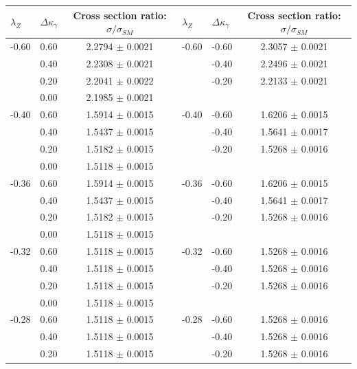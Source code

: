 \begin{table}[h]
\begin{center}
  \begin{tabular}{l l c | l l c}
    \hline  \hline
    $\lambda_Z$  &  $\Delta{\kappa_\gamma}$  & Cross section ratio: $\sigma/\sigma_{SM}$ & 
    $\lambda_Z$  &  $\Delta{\kappa_\gamma}$  & Cross section ratio: $\sigma/\sigma_{SM}$\\\hline
-0.60 & 0.60 & 2.2794 $\pm$ 0.0021 & -0.60 & -0.60 & 2.3057 $\pm$ 0.0021 \\ 
      & 0.40 & 2.2308 $\pm$ 0.0021 &       & -0.40 & 2.2496 $\pm$ 0.0021 \\ 
      & 0.20 & 2.2041 $\pm$ 0.0022 &       & -0.20 & 2.2133 $\pm$ 0.0021 \\ 
      & 0.00 & 2.1985 $\pm$ 0.0021 & &     &                            \\ \hline
-0.40 & 0.60 & 1.5914 $\pm$ 0.0015 & -0.40 & -0.60 & 1.6206 $\pm$ 0.0015 \\ 
      & 0.40 & 1.5437 $\pm$ 0.0015 &       & -0.40 & 1.5641 $\pm$ 0.0017 \\ 
      & 0.20 & 1.5182 $\pm$ 0.0015 &       & -0.20 & 1.5268 $\pm$ 0.0016 \\ 
      & 0.00 & 1.5118 $\pm$ 0.0015 &       &       &                     \\ \hline
-0.36 & 0.60 & 1.5914 $\pm$ 0.0015 & -0.36 & -0.60 & 1.6206 $\pm$ 0.0015 \\ 
      & 0.40 & 1.5437 $\pm$ 0.0015 &       & -0.40 & 1.5641 $\pm$ 0.0017 \\ 
      & 0.20 & 1.5182 $\pm$ 0.0015 &       & -0.20 & 1.5268 $\pm$ 0.0016 \\ 
      & 0.00 & 1.5118 $\pm$ 0.0015 &       &       &                     \\ \hline
-0.32 & 0.60 & 1.5118 $\pm$ 0.0015 & -0.32 & -0.60 & 1.5268 $\pm$ 0.0016 \\ 
      & 0.40 & 1.5118 $\pm$ 0.0015 &       & -0.40 & 1.5268 $\pm$ 0.0016 \\ 
      & 0.20 & 1.5118 $\pm$ 0.0015 &       & -0.20 & 1.5268 $\pm$ 0.0016 \\ 
      & 0.00 & 1.5118 $\pm$ 0.0015 &       &       &                      \\ \hline
-0.28 & 0.60 & 1.5118 $\pm$ 0.0015 & -0.28 & -0.60 & 1.5268 $\pm$ 0.0016 \\ 
      & 0.40 & 1.5118 $\pm$ 0.0015 &       & -0.40 & 1.5268 $\pm$ 0.0016 \\ 
      & 0.20 & 1.5118 $\pm$ 0.0015 &       & -0.20 & 1.5268 $\pm$ 0.0016 \\ 

\end{tabular}
\end{center}
\end{table}
